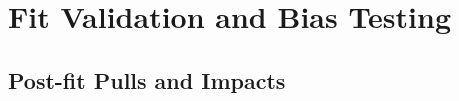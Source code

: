 
\section{Fit Validation and Bias Testing}
\label{sec:bias}

\subsection{Post-fit Pulls and Impacts}




